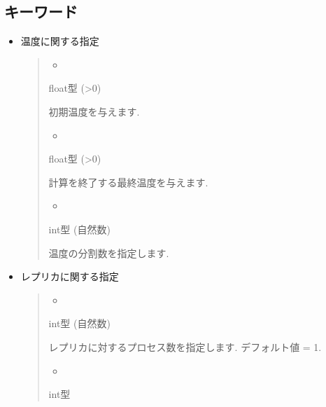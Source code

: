 \documentclass[letterpaper,10pt,dvipdfmx]{sphinxmanual}
\begin{document}
\subsection{キーワード}
\label{\detokenize{file_specification/parameter_replica:id2}}\begin{itemize}
\item {} 
温度に関する指定
\begin{quote}
\begin{itemize}
\item {} 

\end{itemize}

 float型 (\textgreater{}0)

初期温度を与えます.
\begin{itemize}
\item {} 

\end{itemize}

 float型 (\textgreater{}0)

計算を終了する最終温度を与えます.
\begin{itemize}
\item {} 

\end{itemize}

 int型 (自然数)

 温度の分割数を指定します.
\end{quote}

\item {} 
レプリカに関する指定
\begin{quote}
\begin{itemize}
\item {} 

\end{itemize}

 int型 (自然数)

 レプリカに対するプロセス数を指定します. デフォルト値 = 1.
\begin{itemize}
\item {} 

\end{itemize}

 int型


\end{quote}
\end{itemize}
\end{document}
